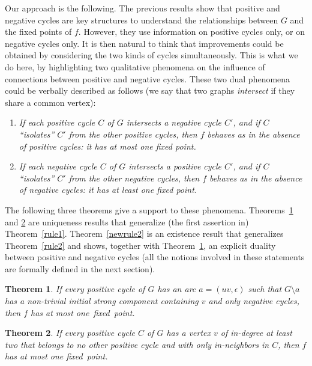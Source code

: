 \documentclass[11pt,a4paper]{article}
\newtheorem{theorem}{Theorem}
\begin{document}
\medskip
Our approach is the following. The previous results show that positive and negative cycles are key structures to understand the relationships between $G$ and the fixed points of $f$. However, they use information on positive cycles only, or on negative cycles only. It is then natural to think that improvements could be obtained by considering the two kinds of cycles simultaneously. This is what we do here, by highlighting two qualitative phenomena on the influence of connections between positive and negative cycles. These two dual phenomena could be verbally described as follows (we say that two graphs {\em intersect} if they share a common vertex): 
\begin{enumerate}
\item
{\em If each positive cycle $C$ of $G$ intersects a negative cycle $C'$, and if $C$  ``isolates'' $C'$ from the other positive cycles, then $f$ behaves as in the absence of positive cycles: it has at most  one fixed point.} 
\item
{\em If each negative cycle $C$ of $G$ intersects a positive cycle $C'$, and if $C$  ``isolates'' $C'$ from the other negative cycles, then $f$ behaves as in the absence of negative cycles: it has at least one fixed point.}
\end{enumerate}

The following three theorems give a support to these phenomena. Theorems~\ref{newrule1} and \ref{renewrule1} are uniqueness results that generalize (the first assertion in) Theorem~\ref{rule1}. Theorem~\ref{newrule2} is an existence result that generalizes Theorem~\ref{rule2} and shows, together with Theorem~\ref{newrule1}, an explicit duality between positive and negative cycles (all the notions involved in these statements are formally defined in the next section). 

\begin{theorem}\label{newrule1}
If every positive cycle of $G$ has an arc $a=(uv,\epsilon)$ such that $G\setminus a$ has a non-trivial initial strong component containing $v$ and only negative cycles, then $f$ has at most one~fixed~point.
\end{theorem}


\begin{theorem}\label{renewrule1}
If every positive cycle $C$ of $G$ has a vertex $v$ of in-degree at least two that belongs to no other positive cycle and with only in-neighbors in $C$, then $f$ has at most one fixed~point. 
\end{theorem} 
\end{document}
